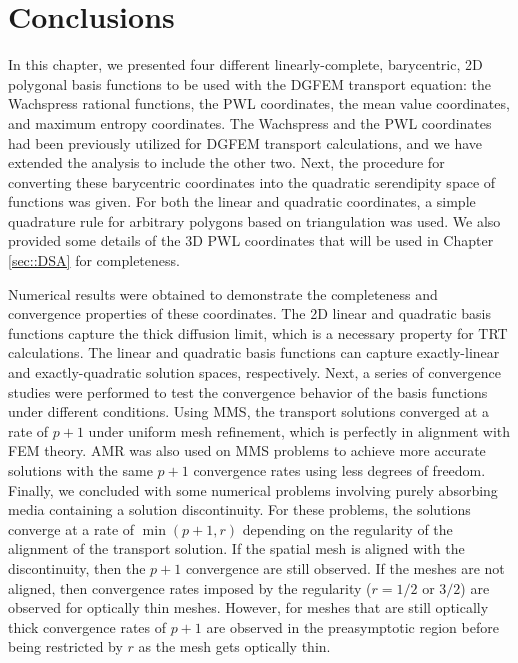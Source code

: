 \section{Conclusions}
\label{sec::BF_Conclusions}

In this chapter, we presented four different linearly-complete, barycentric, 2D polygonal basis functions to be used with the DGFEM transport equation: the Wachspress rational functions, the PWL coordinates, the mean value coordinates, and maximum entropy coordinates. The Wachspress and the PWL coordinates had been previously utilized for DGFEM transport calculations, and we have extended the analysis to include the other two. Next, the procedure for converting these barycentric coordinates into the quadratic serendipity space of functions was given. For both the linear and quadratic coordinates, a simple quadrature rule for arbitrary polygons based on triangulation was used. We also provided some details of the 3D PWL coordinates that will be used in Chapter \ref{sec::DSA} for completeness.

Numerical results were obtained to demonstrate the completeness and convergence properties of these coordinates. The 2D linear and quadratic basis functions capture the thick diffusion limit, which is a necessary property for TRT calculations. The linear and quadratic basis functions can capture exactly-linear and exactly-quadratic solution spaces, respectively. Next, a series of convergence studies were performed to test the convergence behavior of the basis functions under different conditions. Using MMS, the transport solutions converged at a rate of $p+1$ under uniform mesh refinement, which is perfectly in alignment with FEM theory. AMR was also used on MMS problems to achieve more accurate solutions with the same $p+1$ convergence rates using less degrees of freedom. Finally, we concluded with some numerical problems involving purely absorbing media containing a solution discontinuity. For these problems, the solutions converge at a rate of $\min ( p+1 , r)$ depending on the regularity of the alignment of the transport solution. If the spatial mesh is aligned with the discontinuity, then the $p+1$ convergence are still observed. If the meshes are not aligned, then convergence rates imposed by the regularity ($r=1/2$ or $3/2$) are observed for optically thin meshes. However, for meshes that are still optically thick convergence rates of $p+1$ are observed in the preasymptotic region before being restricted by $r$ as the mesh gets optically thin.




